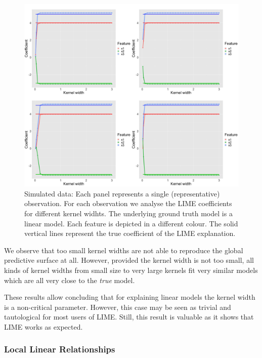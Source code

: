 \documentclass[
]{krantz}
\begin{document}
\begin{figure}

{\centering \includegraphics[width=0.99\linewidth]{images/04-09-08} 

}

\caption{Simulated data: Each panel represents a single (representative) observation. For each observation we analyse the LIME coefficients for different kernel widhts. The underlying ground truth model is a linear model. Each feature is depicted in a different colour. The solid vertical lines represent the true coefficient of the LIME explanation.}\label{fig:lime-fig8}
\end{figure}

We observe that too small kernel widths are not able to reproduce the global predictive surface at all.
However, provided the kernel width is not too small, all kinds of kernel widths from small size to very large kernels fit very similar models which are all very close to the \emph{true} model.

These results allow concluding that for explaining linear models the kernel width is a non-critical parameter.
However, this case may be seen as trivial and tautological for most users of LIME.
Still, this result is valuable as it shows that LIME works as expected.

\hypertarget{id412}{%
\subsubsection{Local Linear Relationships}\label{id412}}
\end{document}
